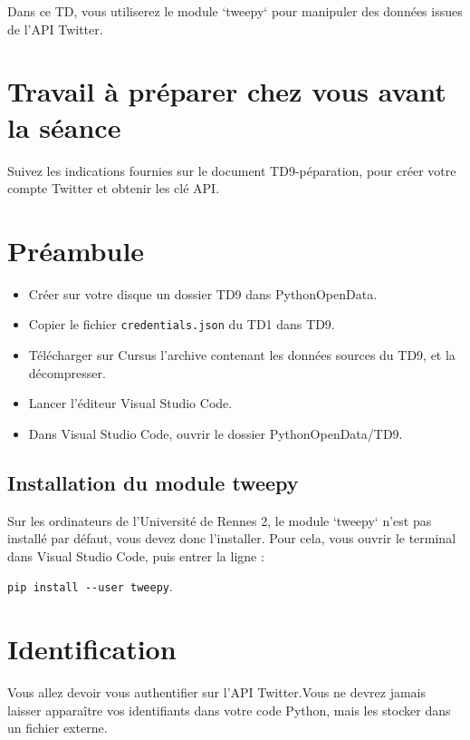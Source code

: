 \documentclass[11pt,a4paper]{article}
\begin{document}
Dans ce TD, vous utiliserez le module `tweepy` pour manipuler des données issues de l'API Twitter.


\section*{Travail à préparer chez vous avant la séance}

Suivez les indications fournies sur le document TD9-péparation, pour créer votre compte Twitter et obtenir les clé API. 

\section*{Préambule}
\begin{itemize}
    \item Créer sur votre disque un dossier TD9 dans PythonOpenData. 
    \item Copier le fichier \verb+credentials.json+ du TD1 dans TD9.
    \item Télécharger sur Cursus l'archive contenant les données sources du TD9, et la décompresser.
    \item Lancer l'éditeur Visual Studio Code.
    \item Dans Visual Studio Code, ouvrir le dossier PythonOpenData/TD9. 
\end{itemize}

\subsection*{Installation du module tweepy}

Sur les ordinateurs de l'Université de Rennes 2, le module `tweepy` n'est pas installé par défaut, vous devez donc l'installer. Pour cela, vous ouvrir le terminal dans Visual Studio Code, puis entrer la ligne : 

\verb+pip install --user tweepy+.

\section{Identification}

Vous allez devoir vous authentifier sur l'API Twitter.Vous ne devrez jamais laisser apparaître vos identifiants dans votre code Python, mais les stocker dans un fichier externe.
\end{document}
